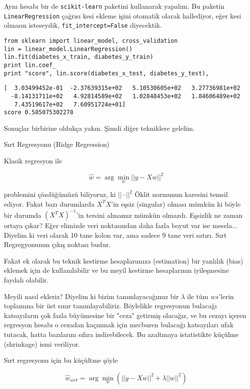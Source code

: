 \documentclass[12pt,fleqn]{article}\usepackage{../../common}
\begin{document}
Aynı hesabı bir de \verb!scikit-learn! paketini kullanarak yapalım. Bu
paketin \verb!LinearRegression! çağrısı kesi ekleme işini otomatik olarak
hallediyor, eğer kesi olmasın isteseydik, \verb!fit_intercept=False!
diyecektik.

\begin{verbatim}
from sklearn import linear_model, cross_validation
lin = linear_model.LinearRegression()
lin.fit(diabetes_x_train, diabetes_y_train)
print lin.coef_
print "score", lin.score(diabetes_x_test, diabetes_y_test), 
\end{verbatim}

\begin{verbatim}
[  3.03499452e-01  -2.37639315e+02   5.10530605e+02   3.27736981e+02
  -8.14131711e+02   4.92814589e+02   1.02848453e+02   1.84606489e+02
   7.43519617e+02   7.60951724e+01]
score 0.585075302278
\end{verbatim}

Sonuçlar birbirine oldukça yakın. Şimdi diğer tekniklere gelelim.

Sırt Regresyonu (Ridge Regression)

Klasik regresyon ile

$$ \hat{w} = \arg \min_w ||y-Xw||^2  $$

problemini çözdüğümüzü biliyoruz, ki $||\cdot||^2$ Öklit normunun karesini
temsil ediyor. Fakat bazı durumlarda $X^TX$'in eşsiz (singular) olması mümkün ki
böyle bir durumda $(X^TX)^{-1}$'in tersini almamız mümkün olmazdı. Eşsizlik ne
zaman ortaya çıkar? Eğer elimizde veri noktasından daha fazla boyut var ise
mesela... Diyelim ki veri olarak 10 tane kolon var, ama sadece 9 tane veri
satırı. Sırt Regregyonunun çıkış noktası budur.

Fakat ek olarak bu teknik kestirme hesaplarımıza (estimation) bir yanlılık
(bias) eklemek için de kullanılabilir ve bu meyil kestirme hesaplarının
iyileşmesine faydalı olabilir.

Meyili nasıl ekleriz? Diyelim ki bizim tanımlayacağımız bir $\lambda$ ile
tüm $ws$'lerin toplamına bir üst sınır tanımlayabiliriz. Böylelikle
regresyonun bulacağı katsayıların çok fazla büyümesine bir "ceza" getirmiş
olacağız, ve bu cezayı içeren regresyon hesabı o cezadan kaçınmak için
mecburen bulacağı katsayıları ufak tutacak, hatta bazılarını sıfıra indirebilecek.
Bu azaltmaya istatistikte küçülme (shrinkage) ismi veriliyor. 

Sırt regresyonu için bu küçültme şöyle

$$ \hat{w}_{sirt} = \arg \min_w ( ||y-Xw||^2 + \lambda||w||^2 )  $$
\end{document}
